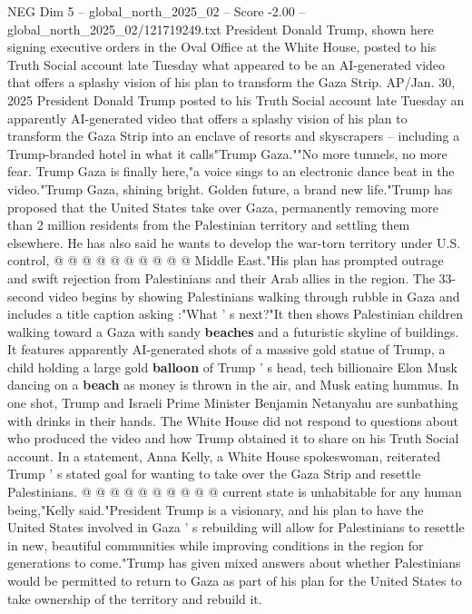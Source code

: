\begin{textsample}{NEG Dim 5 – global\_north\_2025\_02 – Score -2.00 – global\_north\_2025\_02/121719249.txt}  \label{ex:f5_neg_120}
President Donald Trump, shown here signing executive orders in the Oval Office at the White House, posted to his Truth Social account late Tuesday what appeared to be an AI-generated video that offers a splashy vision of his plan to transform the Gaza Strip.
AP/Jan. 30, 2025 President Donald Trump posted to his Truth Social account late Tuesday an apparently AI-generated video that offers a splashy vision of his plan to transform the Gaza Strip into an enclave of resorts and skyscrapers -- including a Trump-branded hotel in what it calls"Trump Gaza.""No more tunnels, no more fear.
Trump Gaza is finally here,"a voice sings to an electronic dance beat in the video."Trump Gaza, shining bright.
Golden future, a brand new life."Trump has proposed that the United States take over Gaza, permanently removing more than 2 million residents from the Palestinian territory and settling them elsewhere.
He has also said he wants to develop the war-torn territory under U.S. control, @ @ @ @ @ @ @ @ @ @ Middle East."His plan has prompted outrage and swift rejection from Palestinians and their Arab allies in the region.
The 33-second video begins by showing Palestinians walking through rubble in Gaza and includes a title caption asking :"What ' s next?"It then shows Palestinian children walking toward a Gaza with sandy \textbf{beaches} and a futuristic skyline of buildings.
It features apparently AI-generated shots of a massive gold statue of Trump, a child holding a large gold \textbf{balloon} of Trump ' s head, tech billionaire Elon Musk dancing on a \textbf{beach} as money is thrown in the air, and Musk eating hummus.
In one shot, Trump and Israeli Prime Minister Benjamin Netanyahu are sunbathing with drinks in their hands.
The White House did not respond to questions about who produced the video and how Trump obtained it to share on his Truth Social account.
In a statement, Anna Kelly, a White House spokeswoman, reiterated Trump ' s stated goal for wanting to take over the Gaza Strip and resettle Palestinians. @ @ @ @ @ @ @ @ @ @ current state is unhabitable for any human being,"Kelly said."President Trump is a visionary, and his plan to have the United States involved in Gaza ' s rebuilding will allow for Palestinians to resettle in new, beautiful communities while improving conditions in the region for generations to come."Trump has given mixed answers about whether Palestinians would be permitted to return to Gaza as part of his plan for the United States to take ownership of the territory and rebuild it.

\end{textsample}
